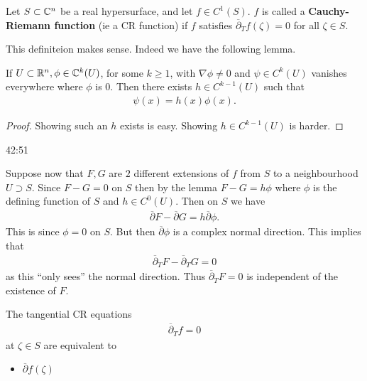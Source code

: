 \begin{definition}
    Let $S \subset \mathbb{C}^n$ be a real hypersurface, and let $f \in C^1 (S)$. $f$ is called a \textbf{Cauchy-Riemann function} (ie a CR function) if $f$ satisfies $\overline{\partial}_T f (\zeta) = 0$ for all $\zeta \in S$.
\end{definition}
This definiteion makes sense. Indeed we have the following lemma.

\begin{lemma}
    If $U \subset \mathbb{R}^n, \phi \in \mathbb{C}^k (U)$, for some $k \geq 1$, with $\nabla \phi \neq 0$ and $\psi \in C^k(U)$ vanishes everywhere where $\phi$ is $0$. Then there exists $h \in C^{k-1}(U)$ such that
    \begin{align*}
        \psi(x) = h(x) \phi(x).
    \end{align*}
\end{lemma}
\begin{proof}
    Showing such an $h$ exists is easy. Showing $h \in C^{k-1}(U)$ is harder.
\end{proof}

42:51

Suppose now that $F,G$ are $2$ different extensions of $f$ from $S$ to a neighbourhood $U \supset S$. Since $F - G = 0$ on $S$ then by the lemma $F - G = h  \phi$ where $\phi$ is the defining function of $S$ and $h \in C^0 (U)$. Then on $S$ we have
\begin{align*}
    \overline{\partial} F - \overline{\partial}G = h \overline{\partial} \phi.
\end{align*}
This is since $\phi =0 $ on $S$. But then $\overline{\partial} \phi$ is a complex normal direction. This implies that
\begin{align*}
    \overline{\partial}_T F - \overline{\partial}_T G = 0
\end{align*}
as this ``only sees'' the normal direction. Thus $\overline{\partial}_T F = 0$ is independent of the existence of $F$.

\begin{theorem}
    The tangential CR equations 
    \begin{align}\label{eq:tangentialCReqs}
        \overline{\partial}_T f = 0
    \end{align}
at $\zeta \in S$ are equivalent to
\begin{itemize}
    \item $\overline{\partial} f (\zeta) $
\end{itemize}
\end{theorem}


